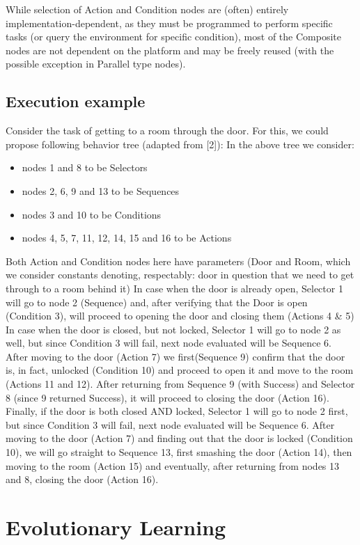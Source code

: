 While selection of  Action and Condition nodes are (often) entirely implementation-dependent, as they must be programmed to perform specific tasks (or query the environment for specific condition), most of the Composite nodes are not dependent on the platform and may be freely reused (with the possible exception in Parallel type nodes).
\subsection{Execution example}
Consider the task of getting to a room through the door. For this, we could propose following behavior tree (adapted from [2]):
In the above tree we consider:
\begin{itemize}
    \item nodes 1 and 8 to be Selectors
    \item nodes 2, 6, 9 and 13 to be Sequences
    \item nodes 3 and 10 to be Conditions
    \item nodes 4, 5, 7, 11, 12, 14, 15 and 16 to be Actions
\end{itemize}
Both Action and Condition nodes here have parameters (Door and Room, which we consider constants denoting, respectably: door in question that we need to get through to a room behind it)
In case when the door is already open, Selector 1 will go to node 2 (Sequence) and, after verifying that the Door is open (Condition 3), will proceed to opening the door and closing them (Actions 4 \& 5)
In case when the door is closed, but not locked, Selector 1 will go to node 2 as well, but since Condition 3 will fail, next node evaluated will be Sequence 6. After moving to the door (Action 7) we first(Sequence 9) confirm that the door is, in fact, unlocked (Condition 10) and proceed to open it and move to the room (Actions 11 and 12). After returning from Sequence 9 (with Success) and Selector 8 (since 9 returned Success), it will proceed to closing the door (Action 16).
Finally,  if the door is both closed AND locked, Selector 1 will go to node 2 first, but since Condition 3 will fail, next node evaluated will be Sequence 6. After moving to the door (Action 7) and finding out that the door is locked (Condition 10), we will go straight to Sequence 13, first smashing the door (Action 14), then moving to the room (Action 15) and eventually, after returning from nodes 13 and 8, closing the door (Action 16).
\section{Evolutionary Learning}
